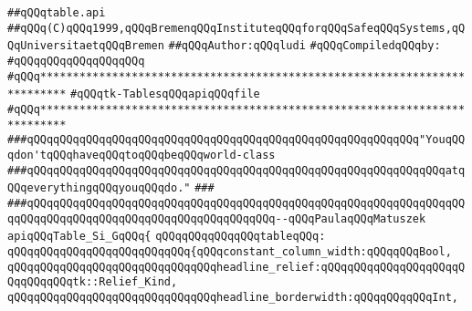 \label{src/lib/tk/src/toolkit/table.api}
\verb|##qQQqtable.api|\newline
\verb|##qQQq(C)qQQq1999,qQQqBremenqQQqInstituteqQQqforqQQqSafeqQQqSystems,qQQqUniversitaetqQQqBremen|\newline
\verb|##qQQqAuthor:qQQqludi|\newline
\newline
\verb|#qQQqCompiledqQQqby:|\newline
\verb|#qQQqqQQqqQQqqQQqqQQq|\newline
\newline
\newline
\newline
\verb|#qQQq**************************************************************************|\newline
\verb|#qQQqtk-TablesqQQqapiqQQqfile|\newline
\verb|#qQQq**************************************************************************|\newline
\newline
\newline
\newline
\verb|###qQQqqQQqqQQqqQQqqQQqqQQqqQQqqQQqqQQqqQQqqQQqqQQqqQQqqQQqqQQq"YouqQQqdon'tqQQqhaveqQQqtoqQQqbeqQQqworld-class|\newline
\verb|###qQQqqQQqqQQqqQQqqQQqqQQqqQQqqQQqqQQqqQQqqQQqqQQqqQQqqQQqqQQqqQQqatqQQqeverythingqQQqyouqQQqdo."|\newline
\verb|###|\newline
\verb|###qQQqqQQqqQQqqQQqqQQqqQQqqQQqqQQqqQQqqQQqqQQqqQQqqQQqqQQqqQQqqQQqqQQqqQQqqQQqqQQqqQQqqQQqqQQqqQQqqQQqqQQqqQQq--qQQqPaulaqQQqMatuszek|\newline
\newline
\newline
\newline
\verb|apiqQQqTable_Si_GqQQq{|\newline
\newline
\verb|qQQqqQQqqQQqqQQqtableqQQq:|\newline
\verb|qQQqqQQqqQQqqQQqqQQqqQQqqQQq{qQQqconstant_column_width:qQQqqQQqBool,|\newline
\verb|qQQqqQQqqQQqqQQqqQQqqQQqqQQqqQQqheadline_relief:qQQqqQQqqQQqqQQqqQQqqQQqqQQqqQQqtk::Relief_Kind,|\newline
\verb|qQQqqQQqqQQqqQQqqQQqqQQqqQQqqQQqheadline_borderwidth:qQQqqQQqqQQqInt,|\newline
